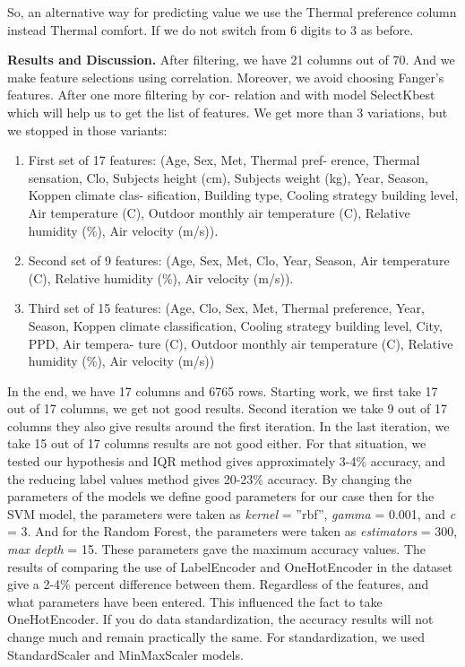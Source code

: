 So, an alternative way for predicting value we use the Thermal
preference column instead Thermal comfort. If we do not switch from 6
digits to 3 as before.

{\bfseries Results and Discussion.} After filtering, we have 21 columns out
of 70. And we make feature selections using correlation. Moreover, we
avoid choosing Fanger's features. After one more filtering by cor-
relation and with model SelectKbest which will help us to get the list
of features. We get more than 3 variations, but we stopped in those
variants:

\begin{enumerate}
\def\labelenumi{\arabic{enumi})}
\item
  First set of 17 features: (Age, Sex, Met, Thermal pref- erence,
  Thermal sensation, Clo, Subjects height (cm), Subjects weight (kg),
  Year, Season, Koppen climate clas- sification, Building type, Cooling
  strategy building level, Air temperature (C), Outdoor monthly air
  temperature (C), Relative humidity (\%), Air velocity (m/s)).
\item
  Second set of 9 features: (Age, Sex, Met, Clo, Year, Season, Air
  temperature (C), Relative humidity (\%), Air velocity (m/s)).
\item
  Third set of 15 features: (Age, Clo, Sex, Met, Thermal preference,
  Year, Season, Koppen climate classification, Cooling strategy building
  level, City, PPD, Air tempera- ture (C), Outdoor monthly air
  temperature (C), Relative humidity (\%), Air velocity (m/s))
\end{enumerate}

In the end, we have 17 columns and 6765 rows. Starting work, we first
take 17 out of 17 columns, we get not good results. Second iteration we
take 9 out of 17 columns they also give results around the first
iteration. In the last iteration, we take 15 out of 17 columns results
are not good either. For that situation, we tested our hypothesis and
IQR method gives approximately 3-4\% accuracy, and the reducing label
values method gives 20-23\% accuracy. By changing the parameters of the
models we define good parameters for our case then for the SVM model,
the parameters were taken as \emph{kernel} = ''rbf'', \emph{gamma} =
0.001, and \emph{c} = 3. And for the Random Forest, the parameters were
taken as \emph{estimators} = 300, \emph{max depth} = 15. These
parameters gave the maximum accuracy values. The results of comparing
the use of LabelEncoder and OneHotEncoder in the dataset give a 2-4\%
percent difference between them. Regardless of the features, and what
parameters have been entered. This influenced the fact to take
OneHotEncoder. If you do data standardization, the accuracy results will
not change much and remain practically the same. For standardization, we
used StandardScaler and MinMaxScaler models.

